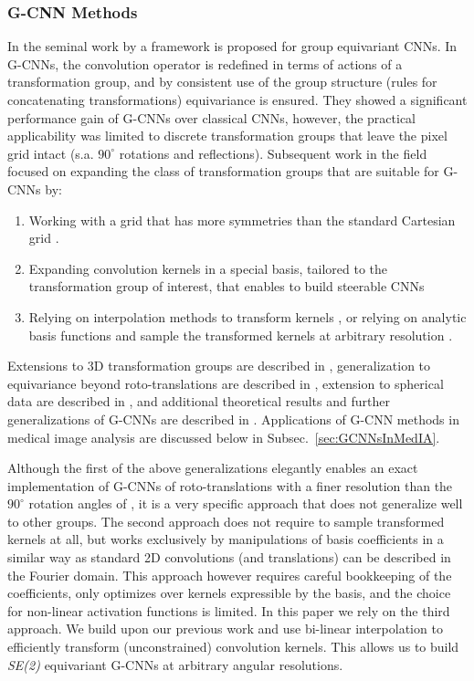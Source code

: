\documentclass[twocolumn,final]{article}
\newcommand{\se}[1]{\textit{SE(#1)}}
\begin{document}
\subsubsection{G-CNN Methods}
In the seminal work by \citet{cohen2016group} a framework is proposed for group equivariant CNNs. In G-CNNs, the convolution operator is redefined in terms of actions of a transformation group, and by consistent use of the group structure (rules for concatenating transformations) equivariance is ensured. They showed a significant performance gain of G-CNNs over classical CNNs, however, the practical applicability was limited to discrete transformation groups that leave the pixel grid intact (s.a. $90^\circ$ rotations and reflections). Subsequent work in the field focused on expanding the class of transformation groups that are suitable for G-CNNs by:
\begin{enumerate}
\item Working with a grid that has more symmetries than the standard Cartesian grid \citep{hoogeboom2018hexaconv}.
\item Expanding convolution kernels in a special basis, tailored to the transformation group of interest, that enables to build steerable CNNs \citep{worrall2017harmonic}
\item Relying on interpolation methods to transform kernels \cite{bekkers2018roto}, or relying on analytic basis functions and sample the transformed kernels at arbitrary resolution \citep{weiler2017learning,bekkers2018template}.
\end{enumerate}
Extensions to 3D transformation groups are described in \citep{worrall2018cubenet,winkels2019nodule,weiler20183d,andrearczyk2019pulmonary}, generalization to equivariance beyond roto-translations are described in \citep{bekkers_b-spline_2019,worrall_deep_2019}, extension to spherical data are described in  \citep{cohen2018spherical,kondor_generalization_2018,thomas_tensor_2018,esteves_learning_2018}, and additional theoretical results and further generalizations of G-CNNs are described in \citep{cohen_general_2018,kondor_generalization_2018,cohen2019gauge}.
Applications of G-CNN methods in medical image analysis are discussed below in Subsec.~\ref{sec:GCNNsInMedIA}. 

Although the first of the above generalizations elegantly enables an exact implementation of G-CNNs of roto-translations with a finer resolution than the $90^\circ$ rotation angles of \citep{cohen2016group}, it is a very specific approach that does not generalize well to other groups. The second approach does not require to sample transformed kernels at all, but works exclusively by manipulations of basis coefficients in a similar way as standard 2D convolutions (and translations) can be described in the Fourier domain. This approach however requires careful bookkeeping of the coefficients, only optimizes over kernels expressible by the basis, and the choice for non-linear activation functions is limited. In this paper we rely on the third approach. We build upon our previous work \citep{bekkers2018roto} and use bi-linear interpolation to efficiently transform (unconstrained) convolution kernels. This allows us to build \se{2} equivariant G-CNNs at arbitrary angular resolutions.
\end{document}
